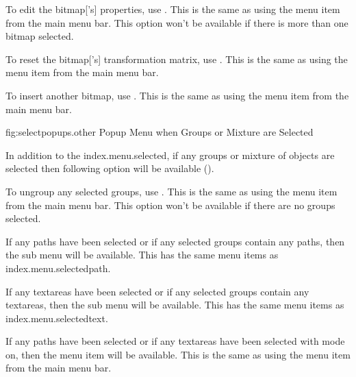 
To edit the \gls{bitmap}['s] properties, use
. This is the same as using
the  menu item from the main menu bar.
This option won't be available if there is more than one
\gls{bitmap} selected.


To reset the \gls{bitmap}['s]
transformation matrix, use . This is the
same as using the  menu item from the main menu
bar.


To insert another \gls{bitmap}, use . This is the
same as using the  menu item from the main menu
bar.



\FloatFig
  {fig:selectpopups.other}
  {}
  {Popup Menu when Groups or Mixture are Selected}

In addition to the \gls{index.menu.selected},
if any \glspl{group} or mixture of \glspl{object} are selected 
then following option will be available
().


To ungroup any selected \glspl{group}, use
. This is the same as using the
 menu item from the main menu bar.
This option won't be available if there are no
\glspl{group} selected.


If any \glspl{path} have been selected or if any selected
\glspl{group} contain any \glspl{path}, then the
 sub menu will be available. This has the same
menu items as \gls{index.menu.selectedpath}.


If any \glspl{textarea} have been selected or if any selected
\glspl{group} contain any \glspl{textarea}, then the
 sub menu will be available. This has the same
menu items as \gls{index.menu.selectedtext}.


If any \glspl{path} have been selected or if any \glspl*{textarea}
have been selected with  mode on, then the
 menu item will be available. This is the
same as using the  menu item from the main
menu bar.

